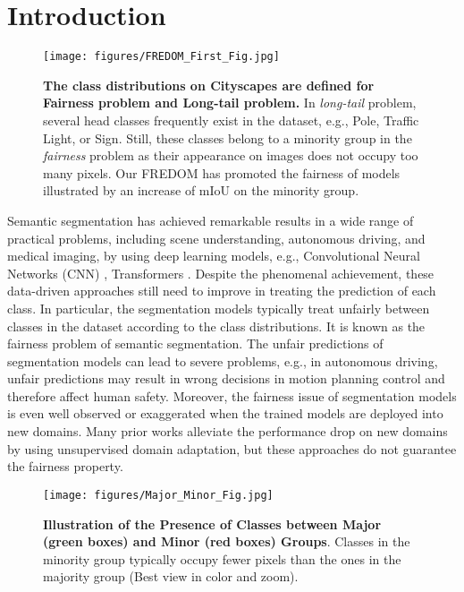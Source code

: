\documentclass[10pt,twocolumn,letterpaper]{article}
\begin{document}
\vspace{-5mm}
\section{Introduction}

\begin{figure}[!ht]
    \centering
    \texttt{[image: figures/FREDOM\_First\_Fig.jpg]}
    \vspace{-6mm}
    \caption{\textbf{The class distributions on Cityscapes are defined for Fairness problem and Long-tail problem.} In \textit{long-tail} problem, several head classes frequently exist in the dataset, e.g., Pole, Traffic Light, or Sign. Still, these classes belong to a minority group in the \textit{fairness} problem as their appearance on images does not occupy too many pixels. 
    Our FREDOM has promoted the fairness of models illustrated by an increase of mIoU on the minority group.}
    \vspace{-6mm}
    \label{fig:fair_long}
\end{figure}

Semantic segmentation has achieved remarkable results in a wide range of practical problems, including scene understanding, autonomous driving, and medical imaging, by using deep learning models, e.g., Convolutional Neural Networks (CNN) \cite{chen2018deeplab, chen2018encoder, lin2017refinenet}, Transformers \cite{xie2021segformer}. Despite the phenomenal achievement, these data-driven approaches still need to improve in treating the prediction of each class. In particular, the segmentation models typically treat unfairly between classes in the dataset according to the class distributions. It is known as the fairness problem of semantic segmentation. The unfair predictions of segmentation models can lead to severe problems, e.g., in autonomous driving, unfair predictions may result in wrong decisions in motion planning control and therefore affect human safety. Moreover, the fairness issue of segmentation models is even well observed or exaggerated when the trained models are deployed into new domains. Many prior works alleviate the performance drop on new domains by using unsupervised domain adaptation, but these approaches do not guarantee the fairness property.

\begin{figure}[!t]
    \centering
    \texttt{[image: figures/Major\_Minor\_Fig.jpg]}
    \vspace{-7mm}
    \caption{\textbf{Illustration of the Presence of Classes between Major (green boxes) and Minor (red boxes) Groups}. Classes in the minority group typically occupy fewer pixels than the ones in the majority group (Best view in color and  zoom).}
    \label{fig:major_minor_fig}
    \vspace{-6mm}
\end{figure}
\end{document}
